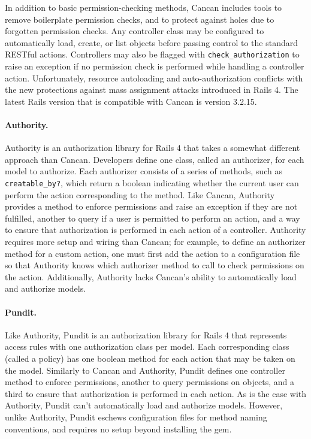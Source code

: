 \documentclass[document.tex]{subfiles}
\begin{document}
In addition to basic permission-checking methods, Cancan includes tools to remove boilerplate permission checks, and to protect against holes due to forgotten permission checks. Any controller class may be configured to automatically load, create, or list objects before passing control to the standard RESTful actions. Controllers may also be flagged with \verb!check_authorization! to raise an exception if no permission check is performed while handling a controller action. Unfortunately, resource autoloading and auto-authorization conflicts with the new protections against mass assignment attacks introduced in Rails 4. The latest Rails version that is compatible with Cancan is version 3.2.15.

\paragraph{Authority.} Authority is an authorization library for Rails 4 that takes a somewhat different approach than Cancan. Developers define one class, called an authorizer, for each model to authorize. Each authorizer consists of a series of methods, such as \verb!creatable_by?!, which return a boolean indicating whether the current user can perform the action corresponding to the method. Like Cancan, Authority provides a method to enforce permissions and raise an exception if they are not fulfilled, another to query if a user is permitted to perform an action, and a way to ensure that authorization is performed in each action of a controller. Authority requires more setup and wiring than Cancan; for example, to define an authorizer method for a custom action, one must first add the action to a configuration file so that Authority knows which authorizer method to call to check permissions on the action. Additionally, Authority lacks Cancan’s ability to automatically load and authorize models.

\paragraph{Pundit.} Like Authority, Pundit is an authorization library for Rails 4 that represents access rules with one authorization class per model. Each corresponding class (called a policy) has one boolean method for each action that may be taken on the model. Similarly to Cancan and Authority, Pundit defines one controller method to enforce permissions, another to query permissions on objects, and a third to ensure that authorization is performed in each action. As is the case with Authority, Pundit can’t automatically load and authorize models. However, unlike Authority, Pundit eschews configuration files for method naming conventions, and requires no setup beyond installing the gem.
\end{document}

